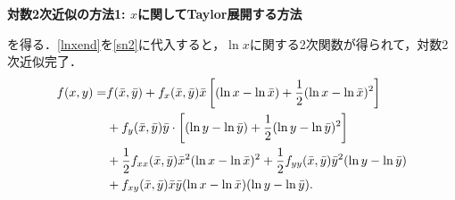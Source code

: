 \documentclass[a4paper,12pt,onecolumn,oneside,notitlepage,final]{article}
\begin{document}
\begin{itembox}[l]{{\bf 対数2次近似の方法1: $x$に関してTaylor展開する方法}}
\begin{itemize}
を得る．\eqref{lnxend}を\eqref{sn2}に代入すると，$\ln x$に関する2次関数が得られて，対数2次近似完了．
\begin{align}
f(x,y) = &f(\bar x, \bar y) + f_x(\bar x, \bar y) \bar x \left[(\ln x - \ln \bar x) + \frac{1}{2}(\ln x - \ln \bar x)^2\right]\notag \\
&+f_y(\bar x, \bar y)\bar y \cdot \left[(\ln y - \ln \bar y) + \frac{1}{2}(\ln y - \ln \bar y)^2\right]\notag \\
&+\frac{1}{2}f_{xx}(\bar x, \bar y)\bar x^2(\ln x - \ln \bar x)^2 + \frac{1}{2}f_{yy}(\bar x, \bar y) \bar y^2 (\ln y -\ln \bar y) \notag\\
&+f_{xy}(\bar x, \bar y)\bar x \bar y (\ln x - \ln \bar x) (\ln y - \ln \bar y).
\end{align}
\end{itemize}
\end{itembox}
\end{document}
